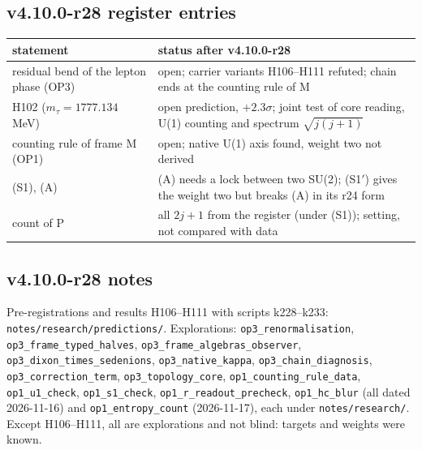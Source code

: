 \subsection*{v4.10.0-r28 register entries}
\label{subsec:v4100-r28-register}

\begin{center}
\small
\begin{tabular}{@{}>{\raggedright\arraybackslash}p{}>{\raggedright\arraybackslash}p{}@{}}
\toprule
statement & status after v4.10.0-r28\\
\midrule
residual bend of the lepton phase (OP3) & open; carrier variants H106--H111 refuted; chain ends at the counting rule of M\\
H102 (\(m_\tau=1777.134\) MeV) & open prediction, \(+2.3\sigma\); joint test of core reading, U(1) counting and spectrum \(\sqrt{j(j+1)}\)\\
counting rule of frame M (OP1) & open; native U(1) axis found, weight two not derived\\
(S1), (A) & (A) needs a lock between two SU(2); (S1\('\)) gives the weight two but breaks (A) in its r24 form\\
count of P & all \(2j+1\) from the register (under (S1)); setting, not compared with data\\
\bottomrule
\end{tabular}
\end{center}

\subsection*{v4.10.0-r28 notes}
\label{subsec:v4100-r28-notes}

Pre-registrations and results H106--H111 with scripts k228--k233: \texttt{notes/\allowbreak research/\allowbreak predictions/}.  Explorations:
\texttt{op3\_\allowbreak renormalisation}, \texttt{op3\_\allowbreak frame\_\allowbreak typed\_\allowbreak halves},
\texttt{op3\_\allowbreak frame\_\allowbreak algebras\_\allowbreak observer}, \texttt{op3\_\allowbreak dixon\_\allowbreak times\_\allowbreak sedenions},
\texttt{op3\_\allowbreak native\_\allowbreak kappa}, \texttt{op3\_\allowbreak chain\_\allowbreak diagnosis},
\texttt{op3\_\allowbreak correction\_\allowbreak term}, \texttt{op3\_\allowbreak topology\_\allowbreak core},
\texttt{op1\_\allowbreak counting\_\allowbreak rule\_\allowbreak data}, \texttt{op1\_\allowbreak u1\_\allowbreak check},
\texttt{op1\_\allowbreak s1\_\allowbreak check}, \texttt{op1\_\allowbreak r\_\allowbreak readout\_\allowbreak precheck},
\texttt{op1\_\allowbreak hc\_\allowbreak blur} (all dated 2026-11-16) and \texttt{op1\_\allowbreak entropy\_\allowbreak count} (2026-11-17), each under
\texttt{notes/\allowbreak research/}.  Except H106--H111, all are explorations and not blind: targets and weights were known.

